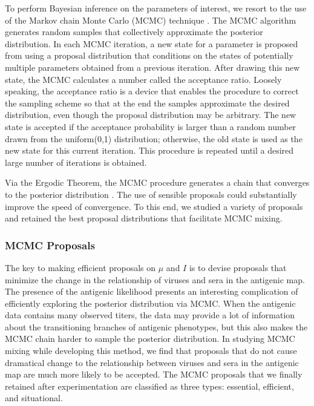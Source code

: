 \documentclass[11pt,oneside,letterpaper]{article}
\begin{document}
To perform Bayesian inference on the parameters of interest, we resort to the use of the Markov chain Monte Carlo (MCMC) technique \cite{hastings_monte_1970, metropolis_equation_1953}.
The MCMC algorithm generates random samples that collectively approximate the posterior distribution.
In each MCMC iteration, a new state for a parameter is proposed from using a proposal distribution that conditions on the states of potentially multiple parameters obtained from a previous iteration.
After drawing this new state, the MCMC calculates a number called the acceptance ratio.
Loosely speaking, the acceptance ratio is a device that enables the procedure to correct the sampling scheme so that at the end the samples approximate the desired distribution, even though the proposal distribution may be arbitrary.
The new state is accepted if the acceptance probability is larger than a random number drawn from the uniform(0,1) distribution; otherwise, the old state is used as the new state for this current iteration.
This procedure is repeated until a desired large number of iterations is obtained.


Via the Ergodic Theorem, the MCMC procedure generates a chain that converges to the posterior distribution \cite{hastings_monte_1970}. %
The use of sensible proposals could substantially improve the speed of convergence.
To this end, we studied a variety of proposals and retained the best proposal distributions that facilitate MCMC mixing.


\subsubsection*{MCMC Proposals}



The key to making efficient proposals on $\mu$ and $I$ is to  devise proposals that minimize the change in the relationship of viruses and sera in the antigenic map.
The presence of the antigenic likelihood presents an interesting complication of efficiently exploring the posterior distribution via MCMC.
When the antigenic data contains many observed titers, the data may provide a lot of information about the transitioning branches of antigenic phenotypes, but this also makes the MCMC chain harder to sample the posterior distribution.
In studying MCMC mixing while developing this method, we find that proposals that do not cause dramatical change to the relationship between viruses and sera in the antigenic map are much more likely to be accepted.
The MCMC proposals that we finally retained after experimentation are classified as three types: essential, efficient, and situational. 
\end{document}
